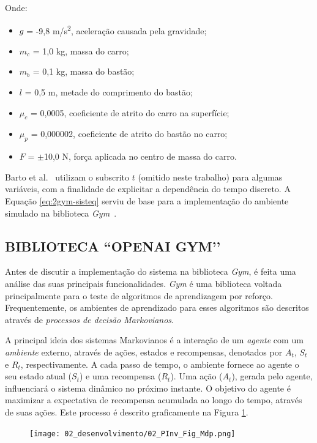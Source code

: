Onde:

\begin{itemize}[label=\raisebox{0.25ex}{\tiny$\bullet$}]
\item $g$ = -9,8 \si{m/s^2}, aceleração causada pela gravidade;
\item $m_c$ = 1,0 \si{kg}, massa do carro;
\item $m_b$ = 0,1 \si{kg}, massa do bastão;
\item $l$ = 0,5 \si{m}, metade do comprimento do bastão;
\item $\mu_c$ = 0,0005, coeficiente de atrito do carro na superfície;
\item $\mu_p$ = 0,000002, coeficiente de atrito do bastão no carro;
\item $F$ = $\pm$10,0 \si{N}, força aplicada no centro de massa do carro.
\end{itemize}

Barto et al.~\cite{barto83CartPole} utilizam o subscrito $t$ (omitido neste trabalho) para algumas variáveis, com a finalidade de explicitar a dependência do tempo discreto. A Equação \ref{eq:2gym-sisteq} serviu de base para a implementação do ambiente simulado na biblioteca \textit{Gym}~\cite{gymCartPole}.

\subsection{BIBLIOTECA ``OPENAI GYM’’}\label{ssec:2gym-openaigym}

Antes de discutir a implementação do sistema na biblioteca \textit{Gym}, é feita uma análise das suas principais funcionalidades. \textit{Gym} é uma biblioteca voltada principalmente para o teste de algoritmos de aprendizagem por reforço. Frequentemente, os ambientes de aprendizado para esses algoritmos são descritos através de \textit{processos de decisão Markovianos}.

A principal ideia dos sistemas Markovianos é a interação de um \textit{agente} com um \textit{ambiente} externo, através de ações, estados e recompensas, denotados por $A_t$, $S_t$ e $R_t$, respectivamente. A cada passo de tempo, o ambiente fornece ao agente o seu estado atual ($S_t$) e uma recompensa ($R_t$). Uma ação ($A_t$), gerada pelo agente, influenciará o sistema dinâmico no próximo instante. O objetivo do agente é maximizar a expectativa de recompensa acumulada ao longo do tempo, através de suas ações. Este processo é descrito graficamente na Figura \ref{fig:2gym-mdp}.

\begin{figure}[!h]
\centering
\texttt{[image: 02\_desenvolvimento/02\_PInv\_Fig\_Mdp.png]}
\label{fig:2gym-mdp}
\end{figure}

